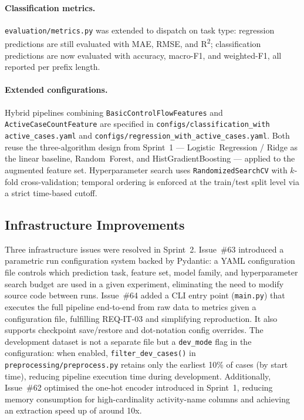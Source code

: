 \documentclass[runningheads]{llncs}
\begin{document}
\paragraph{Classification metrics.} \texttt{evaluation/metrics.py} was extended to dispatch on task type: regression predictions are still evaluated with MAE, RMSE, and R\textsuperscript{2}; classification predictions are now evaluated with accuracy, macro-F1, and weighted-F1, all reported per prefix length.

\paragraph{Extended configurations.} Hybrid pipelines combining \texttt{BasicControlFlowFeatures} and \texttt{ActiveCaseCountFeature} are specified in \texttt{configs/classification\_with active\_cases.yaml} and \texttt{configs/regression\_with\_active\_cases.yaml}.
Both reuse the three-algorithm design from Sprint~1 --- Logistic~Regression / Ridge as the linear baseline, Random~Forest, and HistGradientBoosting --- applied to the augmented feature set. Hyperparameter search uses \texttt{RandomizedSearchCV} with $k$-fold cross-validation; temporal ordering is enforced at the train/test split level via a strict time-based cutoff.

\subsection{Infrastructure Improvements}

Three infrastructure issues were resolved in Sprint~2. Issue~\#63 introduced a parametric run configuration system backed by Pydantic: a YAML configuration file controls which prediction task, feature set, model family, and hyperparameter search budget are used in a given experiment, eliminating the need to modify source code between runs. Issue~\#64 added a CLI entry point (\texttt{main.py}) that executes the full pipeline end-to-end from raw data to metrics given a configuration file, fulfilling REQ-IT-03 and simplifying reproduction. It also supports checkpoint save/restore and dot-notation config overrides. The development dataset is not a separate file but a \texttt{dev\_mode} flag in the configuration: when enabled, \texttt{filter\_dev\_cases()} in \texttt{preprocessing/preprocess.py} retains only the earliest 10\% of cases (by start time), reducing pipeline execution time during development. Additionally, Issue~\#62 optimised the one-hot encoder introduced in Sprint~1, reducing memory consumption for high-cardinality activity-name columns and achieving an extraction speed up of around 10x.
\end{document}
